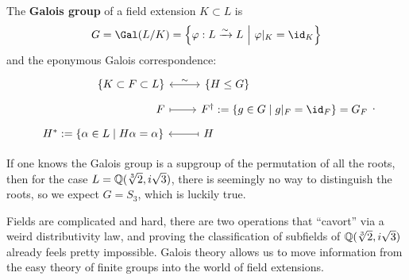 \documentclass{article}
\begin{document}
\begin{theorem}
    The \textbf{Galois group} of a field extension $K\subset L$ is \[
        G = \Gal(L/K) = \left\{\varphi:L \xrightarrow{\sim} L \ \middle| \ \varphi\vert_K = \id_K\right\}
    \] and the eponymous Galois correspondence:\[
    \begin{tikzcd}[row sep = tiny]
        \phantom{..................}\{K\subset F \subset L\} \arrow[r, leftrightarrow, "\sim"] & 
        \{H\leq G\}\phantom{.....................................}\\
        \phantom{.....................................}F \arrow[r, maps to] & 
        F^\dagger := \{g\in G \mid g\vert_F = \id_F\} = G_F\\
        H^* := \{\alpha \in L \mid H\alpha = \alpha\} & 
        H \arrow[l, maps to] \phantom{.................................................}
    \end{tikzcd}.
    \]
\end{theorem}

If one knows the Galois group is a supgroup of the permutation of all the roots, then for the case $L=\mathbb{Q}(\sqrt[3]{2},i\sqrt{3})$, there is seemingly no way to distinguish the roots, so we expect $G=S_3$, which is luckily true.

Fields are complicated and hard, there are two operations that ``cavort'' via a weird distributivity law, and proving the classification of subfields of $\mathbb{Q}(\sqrt[3]{2},i\sqrt{3})$ already feels pretty impossible. Galois theory allows us to move information from the easy theory of finite groups into the world of field extensions.
\end{document}
